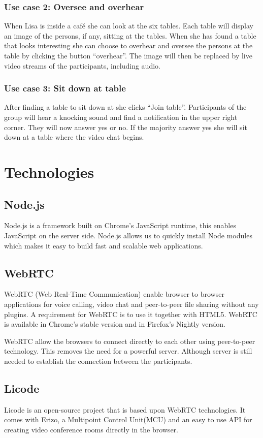 \documentclass[12pt, titlepage]{article}
\begin{document}
\subsubsection{Use case 2: Oversee and overhear}
When Lisa is inside a café she can look at the six tables. Each table will display an image of the persons, if any, sitting at the tables. When she has found a table that looks interesting she can choose to overhear and oversee the persons at the table by clicking the button “overhear”. The image will then be replaced by live video streams of the participants, including audio.
\subsubsection{Use case 3: Sit down at table}
After finding a table to sit down at she clicks “Join table”. Participants of the group will hear a knocking sound and find a notification in the upper right corner. They will now answer yes or no. If the majority answer yes she will sit down at a table where the video chat begins.
\section{Technologies}
\subsection{Node.js}
Node.js\cite{28} is a framework built on Chrome's JavaScript runtime, this enables JavaScript on the server side. Node.js allows us to quickly install Node modules which makes it easy to build fast and scalable web applications. 
\subsection{WebRTC}
WebRTC\cite{8} (Web Real-Time Communication) enable browser to browser applications for voice calling, video chat and peer-to-peer file sharing without any plugins. A requirement for WebRTC is to use it together with HTML5. WebRTC is available in Chrome's stable version and in Firefox's Nightly version.

WebRTC allow the browsers to connect directly to each other using peer-to-peer technology. This removes the need for a powerful server. Although server is still needed to establish the connection between the participants.
\subsection{Licode}
Licode\cite{29} is an open-source project that is based upon WebRTC technologies. It comes with Erizo, a Multipoint Control Unit(MCU) and an easy to use API for creating video conference rooms directly in the browser. 
\end{document}
